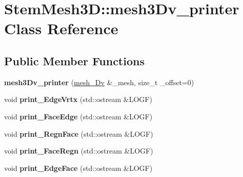 \hypertarget{classStemMesh3D_1_1mesh3Dv__printer}{}\section{Stem\+Mesh3D\+:\+:mesh3\+Dv\+\_\+printer Class Reference}
\label{classStemMesh3D_1_1mesh3Dv__printer}
\subsection*{Public Member Functions}
\begin{DoxyCompactItemize}
\item 
\mbox{\label{classStemMesh3D_1_1mesh3Dv__printer_a4490a28e0f69eb17e82f69bbecbedc91}} 
{\bfseries mesh3\+Dv\+\_\+printer} (\hyperlink{classStemMesh3D_1_1mesh__3Dv}{mesh\+\_\+Dv} \&\+\_\+mesh, size\+\_\+t \+\_\+offset=0)
\item 
\mbox{\label{classStemMesh3D_1_1mesh3Dv__printer_a32ce9cff91c8f2fcbda5420989bd8d34}} 
void {\bfseries print\+\_\+\+Edge\+Vrtx} (std\+::ostream \&L\+O\+GF)
\item 
\mbox{\label{classStemMesh3D_1_1mesh3Dv__printer_accfc89900ee983184755358302ebed2f}} 
void {\bfseries print\+\_\+\+Face\+Edge} (std\+::ostream \&L\+O\+GF)
\item 
\mbox{\label{classStemMesh3D_1_1mesh3Dv__printer_a73fe8c6acb98dcbb29ad6acc25b6e573}} 
void {\bfseries print\+\_\+\+Regn\+Face} (std\+::ostream \&L\+O\+GF)
\item 
\mbox{\label{classStemMesh3D_1_1mesh3Dv__printer_a1564ed9b0f2f6a303fbd66a7fcf6bd50}} 
void {\bfseries print\+\_\+\+Face\+Regn} (std\+::ostream \&L\+O\+GF)
\item 
\mbox{\label{classStemMesh3D_1_1mesh3Dv__printer_a1e2b585ce0b888bfc3bf74314d8751c4}} 
void {\bfseries print\+\_\+\+Edge\+Face} (std\+::ostream \&L\+O\+GF)
\item 
\mbox{\label{classStemMesh3D_1_1mesh3Dv__printer_a93e18afee00e08ec37c4218ecc86635b}} 

\end{DoxyCompactItemize}
